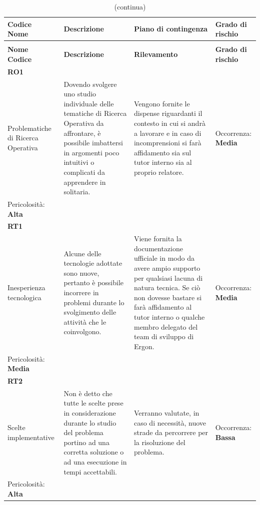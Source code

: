 \renewcommand{\arraystretch}{1.5}
\begin{longtable}{ 
		>{\centering}p{} 
		>{\raggedright}p{}
		>{\raggedright}p{} 
		>{\centering}p{}
	}
	
	\caption{Tabella dei rischi di progetto}\\
	\rowcolorhead
	\textbf{Codice \\ Nome} & \centering{}\textbf{Descrizione} & 
	\centering{}\textbf{Piano di contingenza} & 
	\textbf{Grado di rischio} 
	\tabularnewline
	\endfirsthead
	\rowcolor{white}\caption[]{(continua)}\\
	\rowcolorhead
	\textbf{Nome \\ Codice} & \centering{}\textbf{Descrizione} & 
	\centering{}\textbf{Rilevamento} & 
	\textbf{Grado di rischio} 
	\tabularnewline
	\endhead
	
	\rowcolordark \textbf{RO1} \\ Problematiche di Ricerca Operativa & 
	Dovendo svolgere uno studio individuale delle tematiche di Ricerca Operativa da affrontare, è possibile imbattersi in argomenti poco intuitivi o complicati da apprendere in solitaria. &
	Vengono fornite le dispense riguardanti il contesto in cui si andrà a lavorare e in caso di incomprensioni si farà affidamento sia sul tutor interno sia al proprio relatore. &
	Occorrenza: \textbf{Media} \\
	Pericolosità: \textbf{Alta} 
	\tabularnewline
	
	\rowcolorlight \textbf{RT1} \\ Inesperienza tecnologica & 
	Alcune delle tecnologie adottate sono nuove, pertanto è possibile incorrere in problemi durante lo svolgimento delle attività che le coinvolgono. &
	Viene fornita la documentazione ufficiale in modo da avere ampio supporto per qualsiasi lacuna di natura tecnica. Se ciò non dovesse bastare si farà affidamento al tutor interno o qualche membro delegato del team di sviluppo di Ergon. &
	Occorrenza: \textbf{Media} \\
	Pericolosità: \textbf{Media} 
	\tabularnewline

	\rowcolordark \textbf{RT2} \\ Scelte implementative & 
	Non è detto che tutte le scelte prese in considerazione durante lo studio del problema portino ad una corretta soluzione o ad una esecuzione in tempi accettabili. &
	Verranno valutate, in caso di necessità, nuove strade da percorrere per la risoluzione del problema. &
	Occorrenza: \textbf{Bassa} \\
	Pericolosità: \textbf{Alta} 
	\tabularnewline
	
	
\end{longtable}
\renewcommand{\arraystretch}{1}